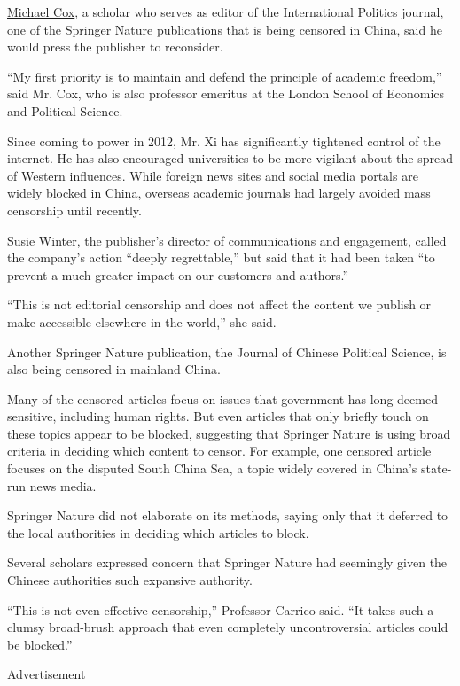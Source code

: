 \href{http://www.lse.ac.uk/researchAndexpertise/experts/profile.aspx?KeyValue=m.e.cox\%40lse.ac.uk}{Michael
Cox}, a scholar who serves as editor of the International Politics
journal, one of the Springer Nature publications that is being censored
in China, said he would press the publisher to reconsider.

``My first priority is to maintain and defend the principle of academic
freedom,'' said Mr. Cox, who is also professor emeritus at the London
School of Economics and Political Science.

Since coming to power in 2012, Mr. Xi has significantly tightened
control of the internet. He has also encouraged universities to be more
vigilant about the spread of Western influences. While foreign news
sites and social media portals are widely blocked in China, overseas
academic journals had largely avoided mass censorship until recently.

Susie Winter, the publisher's director of communications and engagement,
called the company's action ``deeply regrettable,'' but said that it had
been taken ``to prevent a much greater impact on our customers and
authors.''

``This is not editorial censorship and does not affect the content we
publish or make accessible elsewhere in the world,'' she said.

Another Springer Nature publication, the Journal of Chinese Political
Science, is also being censored in mainland China.

Many of the censored articles focus on issues that government has long
deemed sensitive, including human rights. But even articles that only
briefly touch on these topics appear to be blocked, suggesting that
Springer Nature is using broad criteria in deciding which content to
censor. For example, one censored article focuses on the disputed South
China Sea, a topic widely covered in China's state-run news media.

Springer Nature did not elaborate on its methods, saying only that it
deferred to the local authorities in deciding which articles to block.

Several scholars expressed concern that Springer Nature had seemingly
given the Chinese authorities such expansive authority.

``This is not even effective censorship,'' Professor Carrico said. ``It
takes such a clumsy broad-brush approach that even completely
uncontroversial articles could be blocked.''

Advertisement

